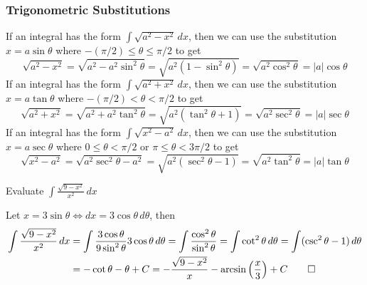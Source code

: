 \subsubsection{Trigonometric Substitutions}
If an integral has the form \(\displaystyle{\int\sqrt{a^2-x^2}\,dx}\),
then we can use the substitution \(x=a\sin\theta\) where
\(-(\pi/2)\leq\theta\leq\pi/2\) to get
\[\sqrt{a^2-x^2}=\sqrt{a^2-a^2\sin^2\theta}=\sqrt{a^2(1-\sin^2\theta)}
=\sqrt{a^2\cos^2\theta}=|a|\cos\theta\]
If an integral has the form \(\displaystyle{\int\sqrt{a^2+x^2}\,dx}\),
then we can use the substitution \(x=a\tan\theta\) where
\(-(\pi/2)<\theta<\pi/2\) to get
\[\sqrt{a^2+x^2}=\sqrt{a^2+a^2\tan^2\theta}=\sqrt{a^2(\tan^2\theta+1)}
=\sqrt{a^2\sec^2\theta}=|a|\sec\theta\]
If an integral has the form \(\displaystyle{\int\sqrt{x^2-a^2}\,dx}\),
then we can use the substitution \(x=a\sec\theta\) where
\(0\leq\theta<\pi/2\) or \(\pi\leq\theta<3\pi/2\) to get
\[\sqrt{x^2-a^2}=\sqrt{a^2\sec^2\theta-a^2}=\sqrt{a^2(\sec^2\theta-1)}
=\sqrt{a^2\tan^2\theta}=|a|\tan\theta\]
\begin{problem}
    Evaluate \(\displaystyle{\int\frac{\sqrt{9-x^2}}{x^2}\,dx}\)
\end{problem}
\begin{solution}
    Let \(x=3\sin\theta\iff dx=3\cos\theta\,d\theta\), then
    \begin{align*}
    \int\frac{\sqrt{9-x^2}}{x^2}\,dx
    &= \int\frac{3\cos\theta}{9\sin^2\theta}3\cos\theta\,d\theta
    =\int\frac{\cos^2\theta}{\sin^2\theta}=\int\cot^2\theta\,d\theta
    =\int(\csc^2\theta-1)\,d\theta \\
    &=-\cot\theta-\theta+C
    =-\frac{\sqrt{9-x^2}}{x}-\arcsin\left(\frac{x}{3}\right)+C \qedhere
    \end{align*}
\end{solution}